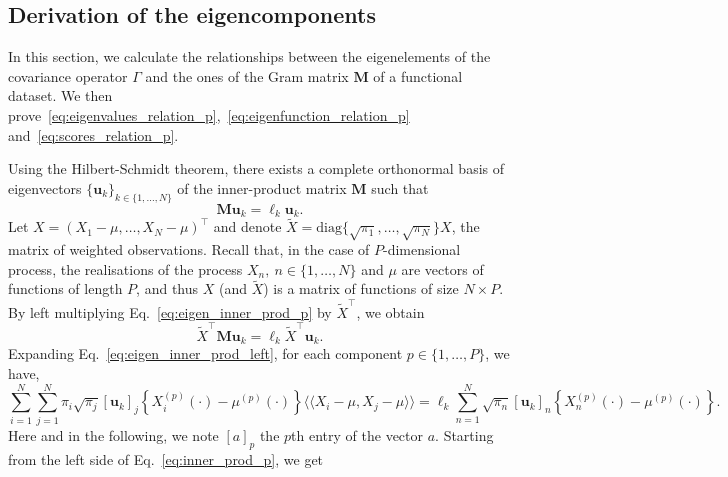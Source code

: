 \documentclass[times,sort&compress,3p]{elsarticle}
\theoremstyle{plain}%
\theoremstyle{definition}
\newcommand{\inH}[2]{\langle\!\langle#1, #2\rangle\!\rangle}
\newcommand{\Xnp}{X_n^{(p)}} %
\begin{document}


\subsection{Derivation of the eigencomponents}  %
\label{sec:derivation_of_the_eigencomponents}

In this section, we calculate the relationships between the eigenelements of the covariance operator $\Gamma$ and the ones of the Gram matrix $\mathbf{M}$ of a functional dataset. We then prove~\eqref{eq:eigenvalues_relation_p},~\eqref{eq:eigenfunction_relation_p} and~\eqref{eq:scores_relation_p}.

Using the Hilbert-Schmidt theorem, there exists a complete orthonormal basis of eigenvectors $\{\boldsymbol{u}_k\}_{k \in \{1, \dots, N\}}$ of the inner-product matrix $\mathbf{M}$ such that
\begin{equation}\label{eq:eigen_inner_prod_p}
    \mathbf{M}\boldsymbol{u}_k = \ell_k\boldsymbol{u}_k.
\end{equation}
Let $X = \left(X_1 - \mu, \dots, X_N - \mu\right)^\top$ and denote $\widetilde{X} = \text{diag}\{\sqrt{\pi_1}, \dots, \sqrt{\pi_N}\}X$, the matrix of weighted observations. Recall that, in the case of $P$-dimensional process, the realisations of the process $X_n,~n \in \{1, \dots, N\}$ and $\mu$ are vectors of functions of length $P$, and thus $X$ (and $\widetilde{X}$) is a matrix of functions of size $N \times P$. By left multiplying Eq.~\eqref{eq:eigen_inner_prod_p} by $\widetilde{X}^\top$, we obtain
\begin{equation}\label{eq:eigen_inner_prod_left}
    \widetilde{X}^\top \mathbf{M} \boldsymbol{u}_k = \ell_k \widetilde{X}^\top \boldsymbol{u}_k.
\end{equation} 
Expanding Eq.~\eqref{eq:eigen_inner_prod_left}, for each component $p \in \{1, \dots, P\}$, we have,
\begin{equation}\label{eq:inner_prod_p}
    \sum_{i = 1}^N \sum_{j = 1}^N \pi_i \sqrt{\pi_j}[\boldsymbol{u}_{k}]_j\left\{X_i^{(p)}(\cdot) - \mu^{(p)}(\cdot)\right\}\inH{X_i - \mu}{X_j - \mu} = \ell_k \sum_{n = 1}^N \sqrt{\pi_n}[\boldsymbol{u}_{k}]_n\left\{\Xnp(\cdot) - \mu^{(p)}(\cdot)\right\}.
\end{equation}
Here and in the following, we note $[a]_p$ the $p$th entry of the vector $a$. Starting from the left side of Eq.~\eqref{eq:inner_prod_p}, we get
\end{document}
